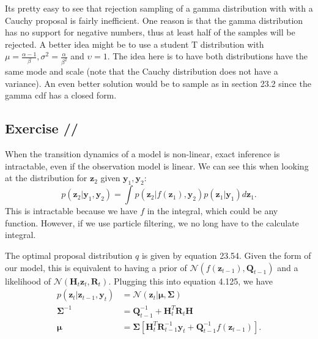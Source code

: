 \documentclass[a4paper,11pt]{article}
\newcounter{exercise}
\newcounter{subexercise}
\newcommand*{\exercise}[1][]{
  \subsection*{Exercise
    \ifx/#1/\stepcounter{exercise}\arabic{exercise}
    \else#1\fi
  }
  \setcounter{subexercise}{0}
}
\begin{document}
	Its pretty easy to see that rejection sampling of a gamma distribution with with a Cauchy
	proposal is fairly inefficient. One reason is that the gamma distribution has no support for
	negative numbers, thus at least half of the samples will be rejected. A better idea might
	be to use a student T distribution with
	$\mu = \frac{ \alpha - 1 }\beta, \sigma^2 = \frac\alpha{ \beta^2 }$
	and $\upsilon=1$. The idea here is to have both distributions have the same mode and scale (note
	that the Cauchy distribution does not have a variance). An even better solution would be to sample
	as in section 23.2 since the gamma cdf has a closed form.

	\exercise
	When the transition dynamics of a model is non-linear, exact inference is intractable, even if
	the observation model is linear. We can see this when looking at the distribution for
	$\mathbf{z}_2$ given $\mathbf{y}_1, \mathbf{y}_2$:
	\[
		p( \mathbf{z}_2| \mathbf{y}_1, \mathbf{y}_2 ) =
		\int p( \mathbf{z}_2 | f(\mathbf{z}_1), \mathbf{y}_2 )
		p( \mathbf{z}_1 | \mathbf{y}_1 ) d\mathbf{z}_1.
	\]
	This is intractable because we have $f$ in the integral, which could be any function.
	However, if we use particle filtering, we no long have to the calculate integral.

	The optimal proposal distribution $q$ is given by equation 23.54. Given the form of our model,
	this is equivalent to having a prior of $\mathcal{N}( f( \mathbf{z}_{t-1} ), \mathbf{Q}_{t-1} )$
	and a likelihood of $\mathcal{N}( \mathbf{H}_t \mathbf{z}_t, \mathbf{R}_t)$. Plugging this into
	equation 4.125, we have
	\begin{align*}
		p( \mathbf{z}_t | \mathbf{z}_{t-1}, \mathbf{y}_{t} )
		&= \mathcal{N}( \mathbf{z}_t | \boldsymbol{\mu}, \boldsymbol{\Sigma} ) \\
		\boldsymbol{\Sigma}^{-1} &= \mathbf{Q}_{t-1}^{-1} + \mathbf{H}_t^T \mathbf{R}_t \mathbf{H} \\
		\boldsymbol{\mu}
		&= \boldsymbol{\Sigma}\left[
		    \mathbf{H}_t^T \mathbf{R}_{t-1}^{-1} \mathbf{y}_t + \mathbf{Q}_{t-1}^{-1}f(\mathbf{z}_{t-1})
		\right].
	\end{align*}
\end{document}
